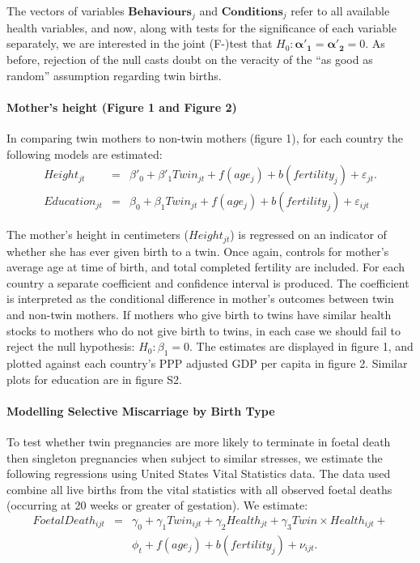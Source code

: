 \documentclass[11pt]{article}
\begin{document}
The vectors of variables $\bm{Behaviours}_j$ and $\bm{Conditions}_j$ refer to all available health variables, and now, along with tests for the significance of each variable separately, we are interested in the joint (F-)test that $H_0:\bm{\alpha'_1}=\bm{\alpha'_2}=0$.  As before, rejection of the null casts doubt on the veracity of the ``as good as random'' assumption regarding twin births.

\paragraph{Mother's height (Figure 1 and Figure 2)}
In comparing twin mothers to non-twin mothers (figure 1), for each country the following models are estimated:
\begin{eqnarray}
  Height_{jt}&=&\beta'_0 + \beta'_1 Twin_{jt} + f(age_j) + b(fertility_j) + \varepsilon_{jt}.\\
  Education_{jt}&=&\beta_0 + \beta_1 Twin_{jt} + f(age_j) + b(fertility_j) + \varepsilon_{ijt}
\end{eqnarray}

The mother's height in centimeters ($Height_{jt}$) is regressed on an indicator of whether she has ever given birth to a twin.  Once again, controls for mother's average age at time of birth, and total completed fertility are included.  For each country a separate coefficient and confidence interval is produced.  The coefficient is interpreted as the conditional difference in mother's outcomes between twin and non-twin mothers.  If mothers who give birth to twins have similar health stocks to mothers who do not give birth to twins, in each case we should fail to reject the null hypothesis: $H_0: \beta_1=0$.  The estimates are displayed in figure 1, and plotted against each country's PPP adjusted GDP per capita in figure 2.  Similar plots for education are in figure S2.

\paragraph{Modelling Selective Miscarriage by Birth Type}
To test whether twin  pregnancies are more likely to terminate in foetal death then singleton pregnancies when subject to similar stresses, we estimate the following regressions using United States Vital Statistics data.  The data used combine all live births from the vital statistics with all observed foetal deaths (occurring at 20 weeks or greater of gestation).  We estimate:
\begin{eqnarray}
  FoetalDeath_{ijt} &=& \gamma_0 + \gamma_1 Twin_{ijt} + \gamma_2 Health_{jt} + \gamma_3 Twin\times Health_{ijt} + \nonumber \\ && \phi_t + f(age_j) + b(fertility_j) + \nu_{ijt}.
\end{eqnarray}
\end{document}
